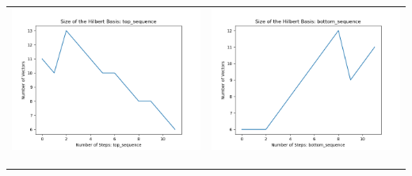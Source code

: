\documentclass[10pt]{article}
\begin{document}
\begin{tabular}{c|c}
\begin{minipage}{.4\textwidth}
\includegraphics[width=\textwidth]{"DATA/4d/5 generators 2 bound E/top_sequence SIZE"}
\end{minipage} &
\begin{minipage}{.4\textwidth}
\includegraphics[width=\textwidth]{"DATA/4d/5 generators 2 bound E bottomup/bottom_sequence SIZE"}
\end{minipage} \\ \\
\hline \\\begin{minipage}{.4\textwidth}

\end{minipage}
\end{tabular}
\end{document}
